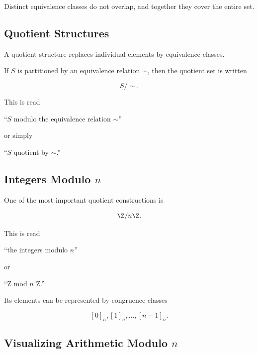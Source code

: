 Distinct equivalence classes do not overlap, and together they cover the entire
set.

\subsection{Quotient Structures}
\label{subsec:quotient-structures}

A quotient structure replaces individual elements by equivalence classes.

If \(S\) is partitioned by an equivalence relation \(\sim\), then the quotient
set is written

\[ S/{\sim}. \]

This is read

\begin{center}
``\(S\) modulo the equivalence relation \(\sim\)''
\end{center}

or simply

\begin{center}
``\(S\) quotient by \(\sim\).''
\end{center}

\subsection{Integers Modulo \(n\)}
\label{subsec:integers-mod-n}

One of the most important quotient constructions is

\[ \Z/n\Z. \]

This is read

\begin{center}
``the integers modulo \(n\)''
\end{center}

or

\begin{center}
``Z mod \(n\) Z.''
\end{center}

Its elements can be represented by congruence classes

\[ [0]_n,[1]_n,\ldots,[n-1]_n. \]

\subsection{Visualizing Arithmetic Modulo \(n\)}
\label{subsec:visual-modular-arithmetic}

